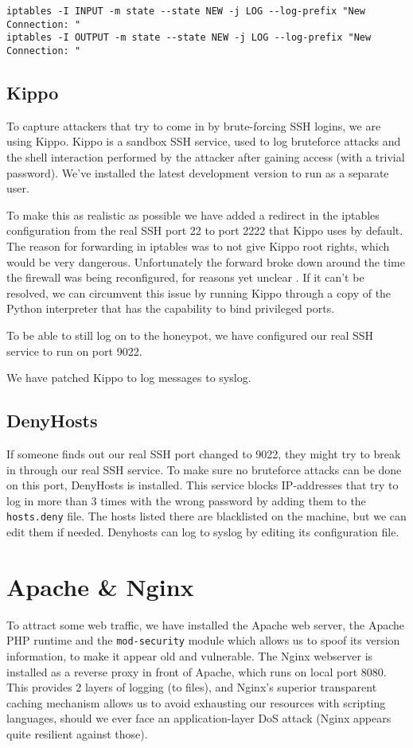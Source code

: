 \documentclass[11pt]{article} %
\begin{document}
\begin{verbatim}
iptables -I INPUT -m state --state NEW -j LOG --log-prefix "New Connection: "
iptables -I OUTPUT -m state --state NEW -j LOG --log-prefix "New Connection: "
\end{verbatim}

\subsection{Kippo}
To capture attackers that try to come in by brute-forcing SSH logins, we are using Kippo. 
Kippo is a sandbox SSH service, used to log bruteforce attacks and the shell interaction performed by the attacker after gaining access (with a trivial password). 
We've installed the latest development version to run as a separate user.

To make this as realistic as possible we have added a redirect in the iptables configuration from the real SSH port 22 to port 2222 that Kippo uses by default.
The reason for forwarding in iptables was to not give Kippo root rights, which would be very dangerous. %
Unfortunately the forward broke down around the time the firewall was being reconfigured, for reasons yet unclear . 
If it can't be resolved, we can circumvent this issue by running Kippo through a copy of the Python interpreter that has the capability to bind privileged ports.

To be able to still log on to the honeypot, we have configured our real SSH service to run on port 9022.

We have patched Kippo to log messages to syslog.

\subsection{DenyHosts}
If someone finds out our real SSH port changed to 9022, they might try to break in through our real SSH service.
To make sure no bruteforce attacks can be done on this port, DenyHosts is installed.
This service blocks IP-addresses that try to log in more than 3 times with the wrong password by adding them to the \verb|hosts.deny| file.
The hosts listed there are blacklisted on the machine, but we can edit them if needed.
Denyhosts can log to syslog by editing its configuration file.

\section{Apache \& Nginx}
To attract some web traffic, we have installed the Apache web server, the Apache PHP runtime and the \verb|mod-security| module which allows us to spoof its version information, to make it appear old and vulnerable.
The Nginx webserver is installed as a reverse proxy in front of Apache, which runs on local port 8080.
This provides 2 layers of logging (to files), and Nginx's superior transparent caching mechanism allows us to avoid exhausting our resources with scripting languages, should we ever face an application-layer DoS attack (Nginx appears quite resilient against those).
\end{document}
